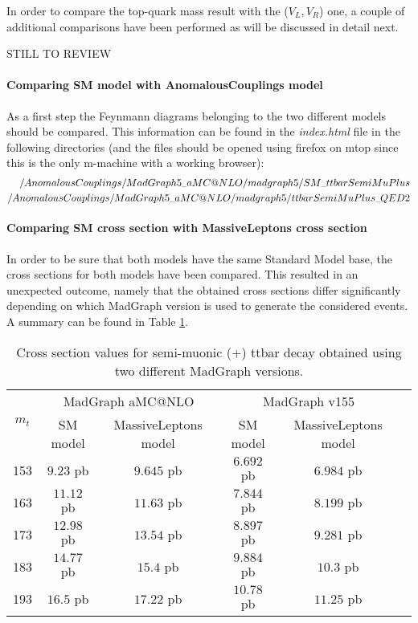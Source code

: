 In order to compare the top-quark mass result with the ($V_L,V_R$) one, a couple of additional comparisons have been performed as will be discussed in detail next.

STILL TO REVIEW

\paragraph{Comparing SM model with AnomalousCouplings model\\}
As a first step the Feynmann diagrams belonging to the two different models should be compared. This information can be found in the \textit{index.html} file in the following directories (and the files should be opened using firefox on mtop since this is the only m-machine with a working browser):
\begin{eqnarray*}
 \tiny{/AnomalousCouplings/MadGraph5\_aMC@NLO/madgraph5/SM\_ttbarSemiMuPlus} \\
 \tiny{/AnomalousCouplings/MadGraph5\_aMC@NLO/madgraph5/ttbarSemiMuPlus\_QED2}
\end{eqnarray*}

\paragraph{Comparing SM cross section with MassiveLeptons cross section\\}
In order to be sure that both models have the same Standard Model base, the cross sections for both models have been compared. This resulted in an unexpected outcome, namely that the obtained cross sections differ significantly depending on which MadGraph version is used to generate the considered events. A summary can be found in Table \ref{table::MGXS}.
\begin{table}[h!]
 \centering
 \begin{tabular}{|c|c|c|c|c|c|}
  \hline
  \multirow{2}{*}{$m_{t}$}	&  \multicolumn{2}{|c|}{MadGraph aMC@NLO}	& \multicolumn{2}{|c|}{MadGraph v155}  	\\
				&  SM model	& MassiveLeptons model		& SM model 	& MassiveLeptons model	\\
  \hline
    153 			& $9.23$ pb	& $9.645$ pb			& $6.692$ pb	& $6.984$ pb		\\
    163				& $11.12$ pb	& $11.63$ pb			& $7.844$ pb	& $8.199$ pb		\\
    173				& $12.98$ pb	& $13.54$ pb			& $8.897$ pb	& $9.281$ pb		\\
    183				& $14.77$ pb	& $15.4$ pb			& $9.884$ pb	& $10.3$ pb		\\
    193				& $16.5$ pb	& $17.22$ pb			& $10.78$ pb	& $11.25$ pb		\\
  \hline 
 \end{tabular} 
 \caption{Cross section values for semi-muonic (+) ttbar decay obtained using two different MadGraph versions.} \label{table::MGXS}
\end{table}


